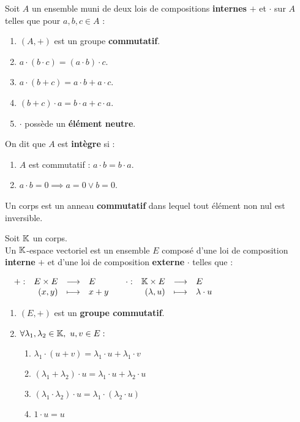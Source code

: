 \begin{definition}
	Soit $A$ un ensemble muni de deux lois de compositions \textbf{internes} \og $+$ \fg et \og $\cdot$ \fg sur $A$ telles que pour $a, b, c \in A$ : 
	\begin{enumerate}
			\item $(A, +)$ est un groupe \textbf{commutatif}.
			\item $a \cdot (b \cdot c) = (a \cdot b) \cdot c$.
			\item $a \cdot (b + c) = a \cdot b + a \cdot c$.
			\item $(b + c) \cdot a = b \cdot a + c \cdot a$.
			\item \og $\cdot$ \fg possède un \textbf{élément neutre}.
		\end{enumerate}
	\noindent On dit que $A$ est \textbf{intègre} si :
	\begin{enumerate}
			\item $A$ est commutatif : $a \cdot b = b \cdot a$.
			\item $a \cdot b = 0 \implies a = 0 \lor b = 0$.
		\end{enumerate}
\end{definition}

\begin{definition}
    Un corps est un anneau \textbf{commutatif} dans lequel tout élément non nul est inversible.
\end{definition}

\begin{definition}
	Soit $\mathbb{K}$ un corps. 
	\\
	Un $\mathbb{K}$-espace vectoriel est un ensemble $E$ composé d'une loi de composition \textbf{interne} \og $+$ \fg et d'une loi de composition \textbf{externe} \og $\cdot$ \fg telles que :
	\begin{center}
		$
		\begin{array}{cc}
			\begin{array}{rrcl} + : & E \times E & \longrightarrow & E \\ & (x,y) & \longmapsto & x+y \end{array}
			&
			\begin{array}{rrcl} \cdot : & \mathbb{K} \times E & \longrightarrow & E \\ & (\lambda, u) & \longmapsto & \lambda \cdot u \end{array}
		\end{array}
		$	
	\end{center}		
	
	\begin{enumerate}
		\item $(E, +)$ est un \textbf{groupe commutatif}.
		\item $\forall \lambda_1, \lambda_2 \in \K,\ u, v \in E :$
		\begin{enumerate}
			\item $\lambda_1 \cdot (u + v) = \lambda_1 \cdot u + \lambda_1 \cdot v$
			\item $(\lambda_1 + \lambda_2) \cdot u = \lambda_1 \cdot u + \lambda_2 \cdot u$
			\item $(\lambda_1 \cdot \lambda_2) \cdot u = \lambda_1 \cdot (\lambda_2 \cdot u)$
			\item $1 \cdot u = u$
		\end{enumerate}
	\end{enumerate}
\end{definition}

